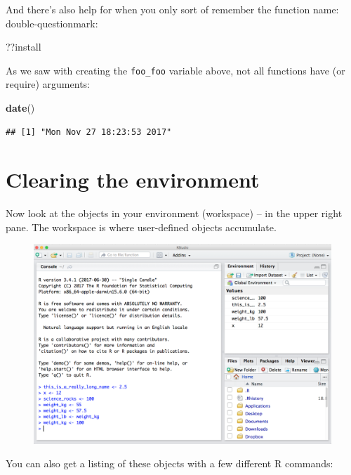 \documentclass[]{book}
\newenvironment{Shaded}{\begin{snugshade}}{\end{snugshade}}
\newcommand{\KeywordTok}[1]{\textcolor[rgb]{0.13,0.29,0.53}{\textbf{{#1}}}}
\newcommand{\NormalTok}[1]{{#1}}
\theoremstyle{definition}
\theoremstyle{definition}
\theoremstyle{definition}
\theoremstyle{remark}
\begin{document}
And there's also help for when you only sort of remember the function
name: double-questionmark:

\begin{Shaded}
\begin{Highlighting}[]
\NormalTok{??install }
\end{Highlighting}
\end{Shaded}

As we saw with creating the \texttt{foo\_foo} variable above, not all
functions have (or require) arguments:

\begin{Shaded}
\begin{Highlighting}[]
\KeywordTok{date}\NormalTok{()}
\end{Highlighting}
\end{Shaded}

\begin{verbatim}
## [1] "Mon Nov 27 18:23:53 2017"
\end{verbatim}

\section{Clearing the environment}\label{clearing-the-environment}

Now look at the objects in your environment (workspace) -- in the upper
right pane. The workspace is where user-defined objects accumulate.

\begin{figure}[htbp]
\centering
\includegraphics{img/RStudio_IDE_env.png}
\caption{}
\end{figure}

You can also get a listing of these objects with a few different R
commands:
\end{document}
